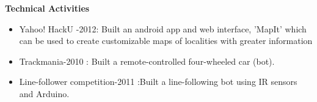 \documentclass[a4paper,10pt]{article}
\newcommand{\resheading}[1]{{\small \colorbox{mygrey}{\begin{minipage}{0.975\textwidth}{\textbf{#1 \vphantom{p\^{E}}}}\end{minipage}}}}
\begin{document}
\resheading{\textbf{\large Technical Activities}}
\begin{itemize}
 \item Yahoo! HackU -2012: Built an android app and web interface, 'MapIt' which can be used to create customizable maps of localities with greater information\\[-0.7cm]
 \item Trackmania-2010 : Built a remote-controlled four-wheeled car (bot). \\[-0.7cm]
 	
 \item Line-follower competition-2011 :Built a line-following bot using IR sensors and Arduino.
\end{itemize}\begin{comment}
\resheading{\textbf{\large Extra Curricular Activities and Achievements}}
\begin{itemize}
  \item Participated in \textbf{Unnati}, the \textbf{NSS} (National Service Scheme) group of IIT Bombay.\\[-0.7cm]
	\begin{itemize}
	 \item Has been involved with the \textbf{GRA} (Group for Rural Activities) as part of curriculum in First year\\[-0.6cm]
	 \item Went to Village trips in Autumn 2010 and Spring 2011.\\[-0.6cm]
	 \item Continued as a voluntary member of the NSS Team in the subsequent year.\\[-0.6cm]
	  \end{itemize}
  \item Worked as `Organiser' in \textbf{Techfest-2011}, in the Lecture Series department. \\[-0.6cm]
  \item Participated in the Inter-hostel Hockey GC. 
\end{itemize}

\resheading{\textbf{\large Extra Courses currently taking (Autumn 2012)}}
  \begin{itemize}
  \item Data Structures and Algorithms
  \item Artificial Intelligence
  \item Foundations of VLSI CAD
\end{itemize}
\end{comment}
\end{document}
